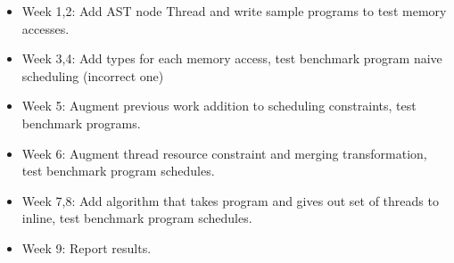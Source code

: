 \documentclass[sigplan,10pt,review]{acmart}
\begin{document}
        \begin{itemize}
            \item Week 1,2: Add AST node Thread and write sample programs to test memory accesses.
            \item Week 3,4: Add types for each memory access, test benchmark program naive scheduling (incorrect one)
            \item Week 5: Augment previous work addition to scheduling constraints, test benchmark programs. 
            \item Week 6: Augment thread resource constraint and merging transformation, test benchmark program schedules.
            \item Week 7,8: Add algorithm that takes program and gives out set of threads to inline, test benchmark program schedules.
            \item Week 9: Report results.
        \end{itemize}
\end{document}
